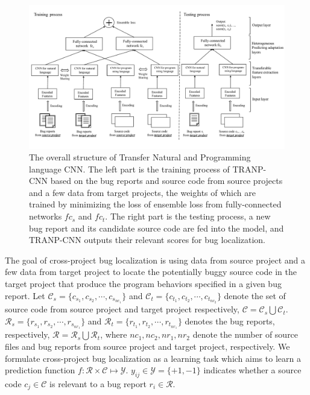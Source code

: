 \begin{figure}[hbt]
\centering
\includegraphics[width = 2\columnwidth]{pic/structure.pdf}
\caption{The overall structure of Transfer Natural and Programming language CNN.  The left part is the training process of TRANP-CNN based on the bug reports and source code from source projects and a few data from target projects, the weights of which are trained by minimizing the loss of ensemble loss from fully-connected networks $fc_s$ and $fc_t$. The right part is the testing process, a new bug report and its candidate source code are fed into the model, and TRANP-CNN outputs their relevant scores for bug localization.}
\label{fig:structure}
\end{figure}


The goal of cross-project bug localization is using data from source project and a few data from target project to locate the potentially buggy source code in the target project that produce the program behaviors specified in a
given bug report. Let $\mathcal{C}_s =\{ c_{s_1}, c_{s_2}, \cdots, c_{s_{nc_1}}\}$ and $\mathcal{C}_t =\{ c_{t_1}, c_{t_2}, \cdots, c_{t_{nc_2}}\}$ denote the set of source code from source project and target project respectively, $\mathcal{C}=\mathcal{C}_s \bigcup \mathcal{C}_t $. $\mathcal{R}_s =\{ r_{s_1}, r_{s_2}, \cdots, r_{s_{nr_1}}\}$ and $\mathcal{R}_t =\{ r_{t_1}, r_{t_2}, \cdots, r_{t_{nr_1}}\}$ denotes the bug reports, respectively, $\mathcal{R}=\mathcal{R}_s \bigcup \mathcal{R}_t $, where $nc_1, nc_2, nr_1, nr_2$ denote the number of source files and bug reports from source project and target project, respectively. We formulate cross-project bug localization as a learning task which aims to learn a prediction function $f: \mathcal{R} \times \mathcal{C} \mapsto \mathcal{Y}$. $y_{ij} \in \mathcal{Y} = \{+1, -1 \}$ indicates whether a source code $c_j \in \mathcal{C} $ is relevant to a bug report $r_i \in \mathcal{R}$.

